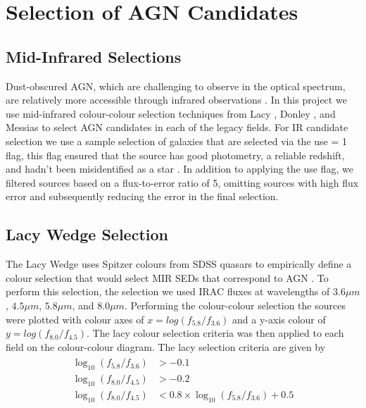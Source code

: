 \documentclass[11pt]{iopart}
\begin{document}
\section{Selection of AGN Candidates}
\subsection{Mid-Infrared Selections}
Dust-obscured AGN, which are challenging to observe in the optical spectrum, are relatively more accessible through infrared observations \cite{yutani_origin_2022}. In this project we use mid-infrared colour-colour selection techniques from Lacy \cite{lacy_obscured_2004, lacy_optical_2007}, Donley \cite{donley_identifying_2012, donley_spitzer_2007}, and Messias \cite{messias_new_2012, messias_dependency_2014}  to select AGN candidates in each of the legacy fields. For IR candidate selection we use a sample selection of galaxies that are selected via the use = 1 flag, this flag ensured that the source has good photometry, a reliable redshift, and hadn't been misidentified as a star \cite{straatman_fourstar_2016}. In addition to applying the use flag, we filtered sources based on a flux-to-error ratio of 5, omitting sources with high flux error and subsequently reducing the error in the final selection.
\subsection{Lacy Wedge Selection}
The Lacy Wedge uses Spitzer colours from SDSS quasars to empirically define a colour selection that would select MIR SEDs that correspond to AGN \cite{lacy_obscured_2004}. To perform this selection, the selection we used IRAC fluxes at wavelengths of $3.6\mu m$, $4.5\mu m$, $5.8\mu m$, and $8.0\mu m$. Performing the colour-colour selection the sources were plotted with colour axes of $x = log(f_{5.8}/f_{3.6})$ and a y-axis colour of $y =log(f_{8.0}/f_{4.5})$. The lacy colour selection criteria was then applied to each field on the colour-colour diagram. The lacy selection criteria are given by
\begin{align*}
    \begin{split}
       \log_{10}\left(f_{5.8}/f_{3.6}\right)&>-0.1\\
       \log_{10}\left(f_{8.0}/f_{4.5}\right)&>-0.2\\
       \log_{10}\left(f_{8.0}/f_{4.5}\right)&<0.8\times\log_{10}\left(f_{5.8}/f_{3.6}\right)+0.5
    \end{split}
\end{align*}
\end{document}
